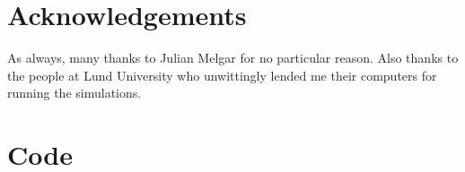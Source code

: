 \documentclass[10pt]{article}\usepackage[]{graphicx}\usepackage[]{color}
\theoremstyle{plain}
\begin{document}
  
  
  
\section{Acknowledgements}
  As always, many thanks to Julian Melgar for no particular reason. Also thanks to the people at Lund University who unwittingly lended me their computers for running the simulations.
  


\newpage
\onecolumn
  \appendix
\section{Code}
   
   
\end{document}
